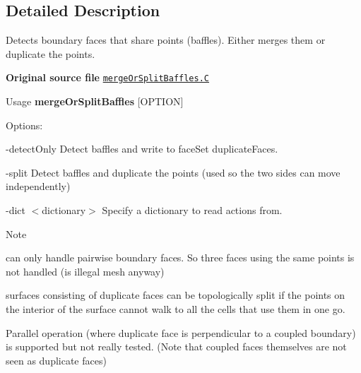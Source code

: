 \subsection{Detailed Description}
Detects boundary faces that share points (baffles). Either merges them or duplicate the points. 

{\bfseries Original source file} \href{../../../home/carlo/data/GeN-Foam/GeN-Foam_ffn/GeN-Foam/GeN-Foam/include/mergeOrSplitBaffles.C}{\tt merge\+Or\+Split\+Baffles.\+C}

\label{_Description}%
 \begin{DoxyParagraph}{Usage}
{\bfseries merge\+Or\+Split\+Baffles} \mbox{[}O\+P\+T\+I\+ON\mbox{]}
\end{DoxyParagraph}
Options\+:
\begin{DoxyItemize}
\item \begin{DoxyParagraph}{-\/detect\+Only}
Detect baffles and write to face\+Set duplicate\+Faces.
\end{DoxyParagraph}

\item \begin{DoxyParagraph}{-\/split}
Detect baffles and duplicate the points (used so the two sides can move independently)
\end{DoxyParagraph}

\item \begin{DoxyParagraph}{-\/dict $<$dictionary$>$}
Specify a dictionary to read actions from.
\end{DoxyParagraph}
\begin{DoxyNote}{Note}

\end{DoxyNote}

\end{DoxyItemize}

can only handle pairwise boundary faces. So three faces using the same points is not handled (is illegal mesh anyway)


\begin{DoxyItemize}
\item surfaces consisting of duplicate faces can be topologically split if the points on the interior of the surface cannot walk to all the cells that use them in one go.
\item Parallel operation (where duplicate face is perpendicular to a coupled boundary) is supported but not really tested. (Note that coupled faces themselves are not seen as duplicate faces) 
\end{DoxyItemize}

